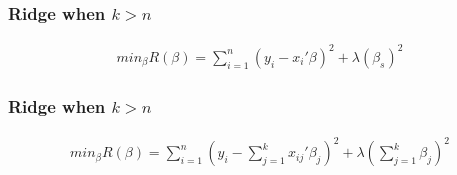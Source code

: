 \documentclass[
  shownotes,
  xcolor={svgnames},
  hyperref={colorlinks,citecolor=DarkBlue,linkcolor=andesred,urlcolor=DarkBlue}
  , aspectratio=169]{beamer}
\begin{document}
\begin{frame}[t]
\frametitle{Ridge when $k>n$}

\begin{align}
min_{\beta} R(\beta) = \sum_{i=1}^n (y_i-x_i'\beta)^2 + \lambda  (\beta_s)^2
\end{align}


\end{frame}

\begin{frame}[t]
\frametitle{Ridge when $k>n$}

\begin{align}
min_{\beta} R(\beta) = \sum_{i=1}^n (y_i-\sum^k_{j=1}x_{ij}'\beta_j)^2 + \lambda  (\sum^k_{j=1} \beta_j)^2
\end{align}

\end{frame}

\end{document}
